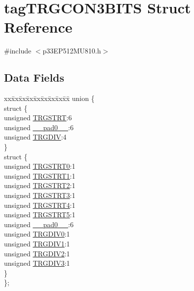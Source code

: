 \hypertarget{structtag_t_r_g_c_o_n3_b_i_t_s}{}\section{tag\+T\+R\+G\+C\+O\+N3\+B\+I\+TS Struct Reference}
\label{structtag_t_r_g_c_o_n3_b_i_t_s}


{\ttfamily \#include $<$p33\+E\+P512\+M\+U810.\+h$>$}

\subsection*{Data Fields}
\begin{DoxyCompactItemize}
\item 
\begin{tabbing}
xx\=xx\=xx\=xx\=xx\=xx\=xx\=xx\=xx\=\kill
union \{\\
\>struct \{\\
\>\>unsigned \hyperlink{structtag_t_r_g_c_o_n3_b_i_t_s_a53d84dcc3e23b3d2db356ea32c245b6f}{TRGSTRT}:6\\
\>\>unsigned \hyperlink{structtag_t_r_g_c_o_n3_b_i_t_s_adf71f3d8410c1f1dbbc96680a92c49af}{\_\_pad0\_\_}:6\\
\>\>unsigned \hyperlink{structtag_t_r_g_c_o_n3_b_i_t_s_a10310cfb772e07d5f62911d0619c3ae0}{TRGDIV}:4\\
\>\} \\
\>struct \{\\
\>\>unsigned \hyperlink{structtag_t_r_g_c_o_n3_b_i_t_s_a75147b4831d3afa487fe9999d2a58c67}{TRGSTRT0}:1\\
\>\>unsigned \hyperlink{structtag_t_r_g_c_o_n3_b_i_t_s_ac76b84548f8cfa382a2d703890b58dad}{TRGSTRT1}:1\\
\>\>unsigned \hyperlink{structtag_t_r_g_c_o_n3_b_i_t_s_a66e40dba969f7a5eafe81b8f341dd665}{TRGSTRT2}:1\\
\>\>unsigned \hyperlink{structtag_t_r_g_c_o_n3_b_i_t_s_a20e528d9be27fc91e2d28bb69f809c0a}{TRGSTRT3}:1\\
\>\>unsigned \hyperlink{structtag_t_r_g_c_o_n3_b_i_t_s_a9e26684d05dfb877c150795a627387cc}{TRGSTRT4}:1\\
\>\>unsigned \hyperlink{structtag_t_r_g_c_o_n3_b_i_t_s_aabeb06bb6258310e01e1a0cd96bf30ca}{TRGSTRT5}:1\\
\>\>unsigned \hyperlink{structtag_t_r_g_c_o_n3_b_i_t_s_adf71f3d8410c1f1dbbc96680a92c49af}{\_\_pad0\_\_}:6\\
\>\>unsigned \hyperlink{structtag_t_r_g_c_o_n3_b_i_t_s_a6d425374bc65bb89be540344ef5393e5}{TRGDIV0}:1\\
\>\>unsigned \hyperlink{structtag_t_r_g_c_o_n3_b_i_t_s_a92a66ed2923cfb0f855e3d9fe36654f9}{TRGDIV1}:1\\
\>\>unsigned \hyperlink{structtag_t_r_g_c_o_n3_b_i_t_s_a8a4ec980bd7f8bdb174f00a7888cdfce}{TRGDIV2}:1\\
\>\>unsigned \hyperlink{structtag_t_r_g_c_o_n3_b_i_t_s_a0b99e8f3f8539f9bf133127a32824612}{TRGDIV3}:1\\
\>\} \\
\}; \\


\end{tabbing}
\end{DoxyCompactItemize}
